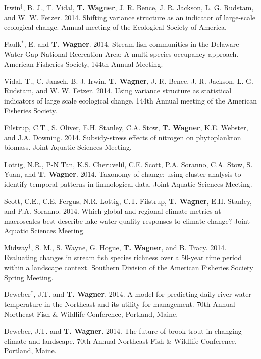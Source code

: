 \documentclass[10pt]{article}
\begin{document}
\begin{flushleft}
\begin{etaremune}
\item Irwin$^\ddagger$, B. J., T. Vidal, {\bf T. Wagner}, J. R. Bence, J. R. Jackson, L. G. Rudstam, and W. W. Fetzer. 2014. Shifting variance structure as an indicator of large-scale ecological change. Annual meeting of the Ecological Society of America.

\item Faulk$^*$, E. and {\bf T. Wagner}. 2014. Stream fish communities in the Delaware Water Gap National Recreation Area: A multi-species occupancy approach. American Fisheries Society, 144th Annual Meeting.

\item Vidal, T., C. Jansch, B. J. Irwin, {\bf T. Wagner}, J. R. Bence, J. R. Jackson, L. G. Rudstam, and W. W. Fetzer. 2014. Using variance structure as statistical indicators of large scale ecological change. 144th Annual meeting of the American Fisheries Society.  

\item Filstrup, C.T., S. Oliver, E.H. Stanley, C.A. Stow, {\bf T. Wagner}, K.E. Webster, and J.A. Downing. 2014. Subsidy-stress effects of nitrogen on phytoplankton biomass. Joint Aquatic Sciences Meeting. 

\item Lottig, N.R., P-N Tan, K.S. Cheruvelil, C.E. Scott, P.A. Soranno, C.A. Stow, S. Yuan, and {\bf T. Wagner}. 2014. Taxonomy of change: using cluster analysis to identify temporal patterns in limnological data. Joint Aquatic Sciences Meeting. 

\item Scott, C.E., C.E. Fergus, N.R. Lottig, C.T. Filstrup, {\bf T. Wagner}, E.H. Stanley, and P.A. Soranno. 2014. Which global and regional climate metrics at macroscales best describe lake water quality responses to climate change? Joint Aquatic Sciences Meeting. 

\item Midway$^\dagger$, S. M., S. Wayne, G. Hogue, {\bf T. Wagner}, and B. Tracy. 2014. Evaluating changes in stream fish species richness over a 50-year time period within a landscape context. Southern Division of the American Fisheries Society Spring Meeting. 

\item Deweber$^*$, J.T. and {\bf T. Wagner}. 2014. A model for predicting daily river water temperature in the Northeast and its utility for management. 70th Annual Northeast Fish \& Wildlife Conference, Portland, Maine.

\item Deweber, J.T. and  {\bf T. Wagner}. 2014. The future of brook trout in changing climate and landscape. 70th Annual Northeast Fish \& Wildlife Conference, Portland, Maine.



\end{etaremune}
\end{flushleft}
\end{document}
